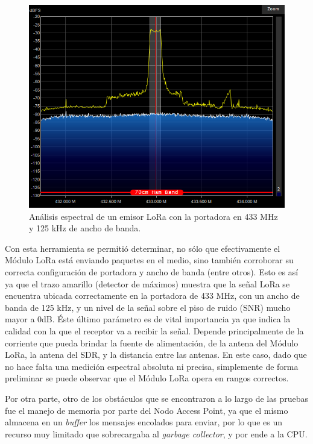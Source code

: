 \begin{figure}[H]
    \centering
    \includegraphics[width=1\linewidth]{Figures/Firmware/espectro.png}
    \caption{Análisis espectral de un emisor LoRa con la portadora en 433 MHz y 125 kHz de ancho de banda.}
    \label{fig:pruebas_firmware_1}
\end{figure}

Con esta herramienta se permitió determinar, no sólo que efectivamente el Módulo LoRa está enviando paquetes en el medio, sino también corroborar su correcta configuración de portadora y ancho de banda (entre otros). Esto es así ya que el trazo amarillo (detector de máximos) muestra que la señal LoRa se encuentra ubicada correctamente en la portadora de 433 MHz, con un ancho de banda de 125 kHz, y un nivel de la señal sobre el piso de ruido (SNR) mucho mayor a 0dB. Éste último parámetro es de vital importancia ya que indica la calidad con la que el receptor va a recibir la señal. Depende principalmente de la corriente que pueda brindar la fuente de alimentación, de la antena del Módulo LoRa, la antena del SDR, y la distancia entre las antenas. En este caso, dado que no hace falta una medición espectral absoluta ni precisa, simplemente de forma preliminar se puede observar que el Módulo LoRa opera en rangos correctos.

Por otra parte, otro de los obstáculos que se encontraron a lo largo de las pruebas fue el manejo de memoria por parte del Nodo Access Point, ya que el mismo almacena en un \textit{buffer} los mensajes encolados para enviar, por lo que es un recurso muy limitado que sobrecargaba al \textit{garbage collector}, y por ende a la CPU.

